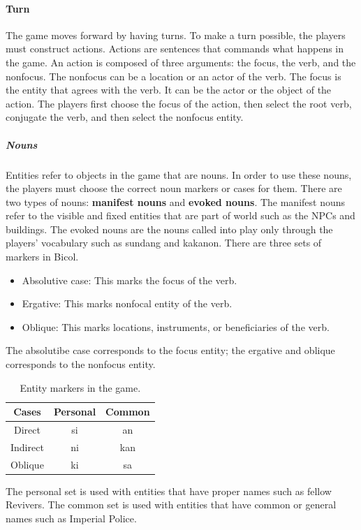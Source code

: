 \documentclass[11pt]{article}
\begin{document}
\paragraph{Turn}
The game moves forward by having turns. To make a turn possible, the players must construct actions. Actions are sentences that commands what happens in the game. An action is composed of three arguments: the focus, the verb, and the nonfocus. The nonfocus can be a location or an actor of the verb. The focus is the entity that agrees with the verb. It can be the actor or the object of the action. The players first choose the focus of the action, then select the root verb, conjugate the verb, and then select the nonfocus entity.
\subparagraph{Nouns}
Entities refer to objects in the game that are nouns. In order to use these nouns, the players must choose the correct noun markers or cases for them. There are two types of nouns: \textbf{manifest nouns} and \textbf{evoked nouns}. The manifest nouns refer to the visible and fixed entities that are part of world such as the NPCs and buildings. The evoked nouns are the nouns called into play only through the players' vocabulary such as sundang and kakanon.
There are three sets of markers in Bicol. \\
\begin{itemize}
\item Absolutive case: This marks the focus of the verb.
\item Ergative: This marks nonfocal entity of the verb.
\item Oblique: This marks locations, instruments, or beneficiaries of the verb.
\end{itemize}
The absolutibe case corresponds to the focus entity; the ergative and oblique corresponds to the nonfocus entity.
\begin{table}[H]
  \centering
  \begin{tabular}{|c|c|c|}
    \hline
    Cases & Personal & Common \\ \hline
    Direct & si & an \\ \hline
    Indirect & ni & kan \\ \hline
    Oblique & ki & sa \\ \hline
  \end{tabular}
  \caption{Entity markers in the game.}
  \label{tab:markers}
\end{table}
The personal set is used with entities that have proper names such as fellow Revivers. The common set is used with entities that have common or general names such as Imperial Police.
    
\end{document}
